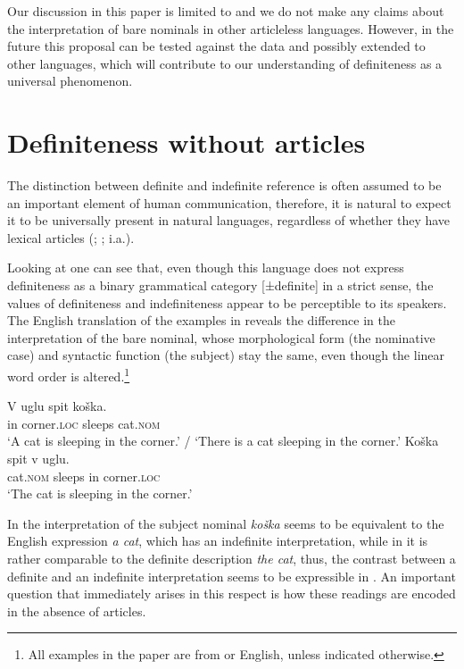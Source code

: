 \documentclass[output=paper]{langscibook}
\begin{document}
Our discussion in this paper is limited to  and we do not make any claims
about the interpretation of bare nominals in other articleless languages. However, in the future this proposal can be tested against the data and possibly extended to other languages, which will contribute to our understanding of definiteness as a universal phenomenon.

\section{Definiteness without articles}
\label{sec:definiteness-without-articles}
The distinction between definite and indefinite reference is often assumed to be an important element of human communication, therefore, it is natural to expect it to be universally present in natural languages, regardless of whether they have lexical articles (\citealt{Brun2001}; %
\citealt{Zlatic2014}; i.a.).

Looking at  one can see that, even though this language does not express definiteness as a binary %
grammatical category [±definite] in a strict sense, the values of definiteness and indefiniteness %
appear to be perceptible to its speakers. The English translation of the  examples in  reveals the difference in the interpretation of the bare nominal, whose morphological form (the nominative case) and syntactic function (the subject) stay the same, even though the linear word order is altered.\footnote{All examples in the paper are from  or English, unless indicated otherwise.}

\ea \label{koshka}
\ea \label{ex:seres:1a} \gll V uglu spit koška.\\
         in corner.\textsc{loc} sleeps cat.\textsc{nom}\\
\glt    `A cat is sleeping in the corner.' / `There is a cat sleeping in the corner.'
\ex \label{ex:seres:1b}
 \gll Koška	spit v uglu. \\
    cat.\textsc{nom} 	sleeps 	in 	corner.\textsc{loc} \\
 \glt   `The cat is sleeping in the corner.'
\z\z

\noindent In  the interpretation of the subject nominal \textit{koška} seems to be equivalent to the English expression \textit{a cat}, which has an indefinite interpretation, while in  it is rather comparable to the definite description \textit{the cat}, thus, the contrast between a definite and an indefinite interpretation seems to be
expressible in . An important question that immediately arises in this respect is how these readings are encoded in the absence of articles.
\end{document}
